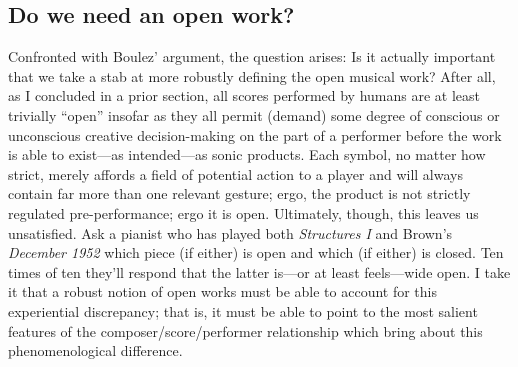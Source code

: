 
    
    


\subsection{Do we need an open work?}

    Confronted with Boulez' argument, the question arises: Is it actually important that we take a stab at more robustly defining the open musical work? After all, as I concluded in a prior section, all scores performed by humans are at least trivially ``open'' insofar as they all permit (demand) some degree of conscious or unconscious creative decision-making on the part of a performer before the work is able to exist---as intended---as sonic products. Each symbol, no matter how strict, merely affords a field of potential action to a player and will always contain far more than one relevant gesture; ergo, the product is not strictly regulated pre-performance; ergo it is open. Ultimately, though, this leaves us unsatisfied. Ask a pianist who has played both \textit{Structures I} and Brown's \textit{December 1952} which piece (if either) is open and which (if either) is closed. Ten times of ten they'll respond that the latter is---or at least feels---wide open. I take it that a robust notion of open works must be able to account for this experiential discrepancy; that is, it must be able to point to the most salient features of the composer/score/performer relationship which bring about this phenomenological difference.
    
